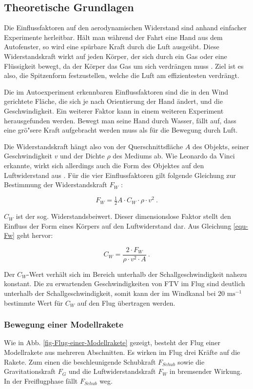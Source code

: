 \documentclass[10pt,a4paper]{article}
\begin{document}
\subsection{Theoretische Grundlagen}

Die Einflussfaktoren auf den aerodynamischen Widerstand sind anhand einfacher Experimente herleitbar. Hält man während der Fahrt eine Hand aus dem Autofenster, so wird eine spürbare Kraft durch die Luft ausgeübt. Diese Widerstandskraft wirkt auf jeden Körper, der sich durch ein Gas oder eine Flüssigkeit bewegt, da der Körper das Gas um sich verdrängen muss \cite{dlr,lp}. Ziel ist es also, die Spitzenform festzustellen, welche die Luft am effizientesten verdrängt.

Die im Autoexperiment erkennbaren Einflussfaktoren sind die in den Wind gerichtete Fläche, die sich je nach Orientierung der Hand ändert, und die Geschwindigkeit. Ein weiterer Faktor kann in einem weiteren Experiment herausgefunden werden. Bewegt man seine Hand durch Wasser, fällt auf, dass eine grö"sere Kraft aufgebracht werden muss als für die Bewegung durch Luft.

Die Widerstandskraft hängt also von der Querschnittsfläche $A$ des Objekts, seiner Geschwindigkeit $v$ und der Dichte $\rho$ des Mediums ab. Wie Leonardo da Vinci erkannte, wirkt sich allerdings auch die Form des Objektes auf den Luftwiderstand aus \cite{hw}.
Für die vier Einflussfaktoren gilt folgende Gleichung zur Bestimmung der Widerstandskraft $F_{W}$ \cite{lp}:

\begin{equation}
F_{W}=\tfrac{1}{2} A \cdot C_{W} \cdot \rho \cdot v^2
\label{equ-Fw} \ .
\end{equation} 

\noindent
$C_{W}$ ist der sog. Widerstandsbeiwert. Dieser dimensionslose Faktor stellt den Einfluss der Form eines Körpers auf den Luftwiderstand dar. Aus Gleichung \eqref{equ-Fw} geht hervor:

$$ C_{W}=\frac{2 \cdot F_{W}}{\rho \cdot v^2 \cdot A} \ . $$

\noindent
Der $C_{W}$-Wert verhält sich im Bereich unterhalb der Schallgeschwindigkeit nahezu konstant. Die zu erwartenden Geschwindigkeiten von FTV im Flug sind deutlich unterhalb der Schallgeschwindigkeit, somit kann der im Windkanal bei $20 \text{ ms}^{-1}$ bestimmte Wert für $C_{W}$ auf den Flug übertragen werden.


\subsubsection{Bewegung einer Modellrakete} 
Wie in Abb. \ref{fig-Flug-einer-Modellrakete} gezeigt, besteht der Flug einer Modellrakete aus mehreren Abschnitten. Es wirken im Flug drei Kräfte auf die Rakete. Zum einen die beschleunigende Schubkraft $F_{Schub}$ sowie die Gravitationskraft $F_{G}$ und die Luftwiderstandskraft $F_{W}$ in bremsender Wirkung. In der Freiflugphase fällt $F_{Schub}$ weg.
\end{document}
